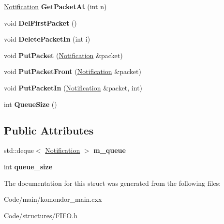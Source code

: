 \begin{DoxyCompactItemize}
\item 
\mbox{\label{structFIFO_a4d2f64e8642a1e06a1e3e2501e800e27}} 
\hyperlink{structNotification}{Notification} {\bfseries Get\+Packet\+At} (int n)
\item 
\mbox{\label{structFIFO_acb3779ce28727cbe31c470d4aa2750de}} 
void {\bfseries Del\+First\+Packet} ()
\item 
\mbox{\label{structFIFO_aac6e353d21c13159cf0b96e739c24139}} 
void {\bfseries Delete\+Packet\+In} (int i)
\item 
\mbox{\label{structFIFO_a3aecc7b5584eb3160d1e6a3d9b6c3998}} 
void {\bfseries Put\+Packet} (\hyperlink{structNotification}{Notification} \&packet)
\item 
\mbox{\label{structFIFO_ade1f262e3c104b2d7b537d8edf6cb5ae}} 
void {\bfseries Put\+Packet\+Front} (\hyperlink{structNotification}{Notification} \&packet)
\item 
\mbox{\label{structFIFO_af5cee3f058378244a1ea0e51e1011f60}} 
void {\bfseries Put\+Packet\+In} (\hyperlink{structNotification}{Notification} \&packet, int)
\item 
\mbox{\label{structFIFO_a9f792cca246856881b4b6f2c9672d388}} 
int {\bfseries Queue\+Size} ()
\end{DoxyCompactItemize}
\subsection*{Public Attributes}
\begin{DoxyCompactItemize}
\item 
\mbox{\label{structFIFO_a6b584f6221023c4648121860cf0f7762}} 
std\+::deque$<$ \hyperlink{structNotification}{Notification} $>$ {\bfseries m\+\_\+queue}
\item 
\mbox{\label{structFIFO_a8c701744c01468c6fc8c98e547bc8e26}} 
int {\bfseries queue\+\_\+size}
\end{DoxyCompactItemize}


The documentation for this struct was generated from the following files\+:\begin{DoxyCompactItemize}
\item 
Code/main/komondor\+\_\+main.\+cxx\item 
Code/structures/F\+I\+F\+O.\+h\end{DoxyCompactItemize}
